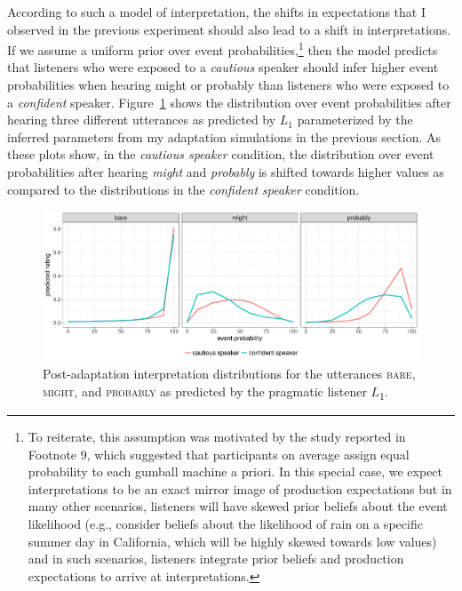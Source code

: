 According to such a model of interpretation, the shifts in expectations that I observed in the previous experiment should also lead to a shift in interpretations. 
If we assume a uniform prior over event probabilities,\footnote{To reiterate, this assumption was motivated by the study reported in Footnote 9, which suggested that participants on average assign equal probability to each gumball machine a priori. In this special case, we expect interpretations to be an exact mirror image of production expectations but in many other scenarios, listeners will have skewed prior beliefs about the event likelihood (e.g., consider beliefs about the likelihood of rain on a specific summer day in California, which will be highly skewed towards low values) and in such scenarios, listeners integrate prior beliefs and  production expectations to arrive at interpretations.} then the model predicts that listeners who were exposed to a \textit{cautious} speaker should infer 
higher event probabilities when hearing {\sc might} or {\sc probably} than listeners who were exposed to a \textit{confident} speaker. Figure~\ref{fig:post-exposure-comp}
shows the distribution over event probabilities after hearing three different utterances as predicted by $L_1$ parameterized by the inferred parameters from my
adaptation simulations in the previous section. As these plots show, in the \textit{cautious speaker} condition, the distribution over event probabilities after hearing \textit{might} 
and \textit{probably} is shifted towards higher values as compared to the distributions in the \textit{confident speaker} condition. 

\begin{figure}
  \includegraphics[width=\textwidth]{plots/fig-13-adaptation-posterior-comp.pdf}
  \caption{Post-adaptation interpretation distributions for the utterances  \textsc{bare}, \textsc{might}, and \textsc{probably} as predicted by the pragmatic listener $L$\textsubscript{$1$}. \label{fig:post-exposure-comp}}
\end{figure}


